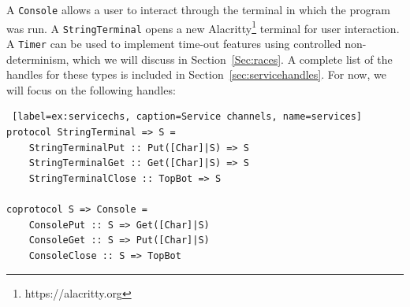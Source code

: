 \documentclass[acmsmall]{acmart}
\begin{document}
A \lstinline$Console$ allows a user to interact through the terminal in which the program was run.
A \lstinline$StringTerminal$ opens a new Alacritty\footnote{https://alacritty.org} terminal for user interaction.
A \lstinline$Timer$ can be used to implement time-out features using controlled non-determinism, which we will discuss in Section~\ref{Sec:races}.
A complete list of the handles for these types is included in Section~\ref{sec:servicehandles}.
For now, we will focus on the following handles:
\begin{lstlisting} [label=ex:servicechs, caption=Service channels, name=services] 
protocol StringTerminal => S =
    StringTerminalPut :: Put([Char]|S) => S
    StringTerminalGet :: Get([Char]|S) => S 
    StringTerminalClose :: TopBot => S
    
coprotocol S => Console =
    ConsolePut :: S => Get([Char]|S) 
    ConsoleGet :: S => Put([Char]|S) 
    ConsoleClose :: S => TopBot 
\end{lstlisting}
\end{document}
